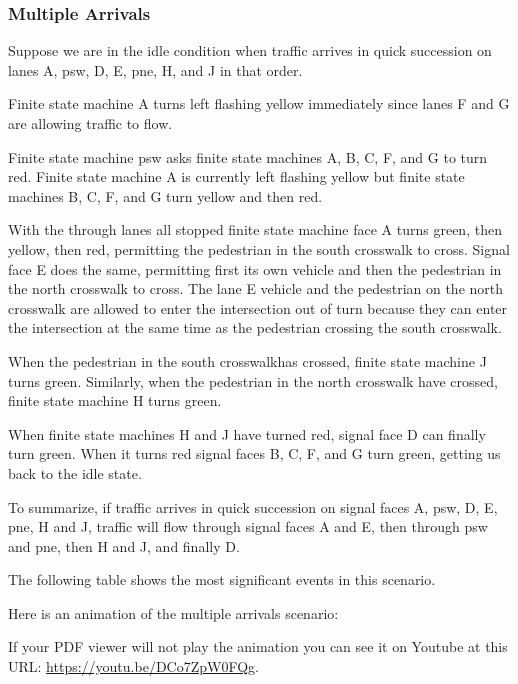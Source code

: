 \documentclass[letterpaper,twoside]{article}
\begin{document}
\subsubsection{Multiple Arrivals}

Suppose we are in the idle condition when traffic arrives in quick succession
on lanes A, psw, D, E, pne, H, and J in that order.

Finite state machine A turns left flashing yellow immediately since lanes
F and G are allowing traffic to flow.

Finite state machine psw asks finite state machines A, B, C, F, and G to
turn red.
Finite state machine A is currently left flashing yellow but finite state
machines B, C, F, and G turn yellow and then red.

With the through lanes all stopped finite state machine face A turns
green, then yellow, then red, permitting the pedestrian in the south
crosswalk to cross.  Signal face E does the same, permitting first its
own vehicle and then the
pedestrian in the north crosswalk to cross.  The lane E vehicle and
the pedestrian on the north crosswalk are allowed
to enter the intersection out of turn because they can enter the
intersection at the same time as the pedestrian crossing the south crosswalk.

When the pedestrian in the south crosswalkhas crossed, finite state machine
J turns green.  Similarly, when the pedestrian in the
north crosswalk have crossed, finite state machine H turns green.

When finite state machines H and J have turned red, signal face D
can finally turn green.  When it turns red signal faces
B, C, F, and G turn green, getting us back to the idle state.

To summarize, if traffic arrives in quick succession on signal faces
A, psw, D, E, pne, H and J, traffic will flow through signal faces
A and E, then through psw and pne, then H and J, and finally D.

The following table shows the most significant events in this scenario.



Here is an animation of the multiple arrivals scenario:

\noindent{}

If your PDF viewer will not play the animation you can see it on Youtube
at this URL:
\href{https://youtu.be/DCo7ZpW0FQg}{https://youtu.be/DCo7ZpW0FQg}.
\end{document}
